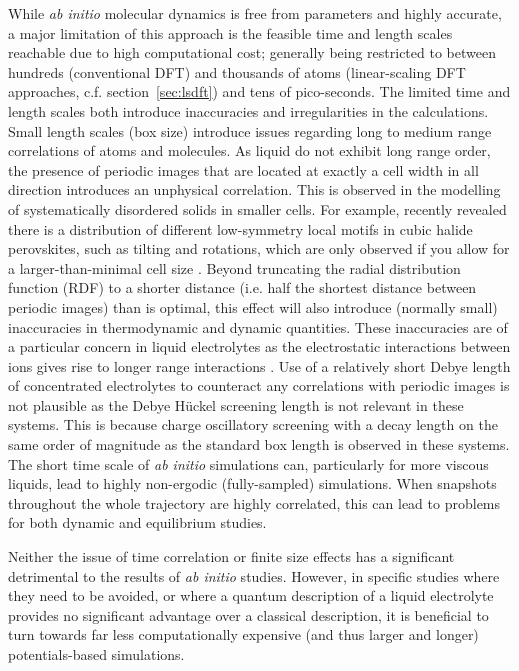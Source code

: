 \documentclass[../main.tex]{subfiles}
\begin{document}
While \textit{ab initio} molecular dynamics is free from parameters and highly accurate, a major limitation of this approach is the feasible time and length scales reachable due to high computational cost; generally being restricted to between hundreds (conventional DFT) and thousands of atoms (linear-scaling DFT approaches, c.f. section~\ref{sec:lsdft}) and tens of pico-seconds. The limited time and length scales both introduce inaccuracies and irregularities in the calculations. Small length scales (box size) introduce issues regarding long to medium range correlations of atoms and molecules. As liquid do not exhibit long range order, the presence of periodic images that are located at exactly a cell width in all direction introduces an unphysical correlation. This is observed in the modelling of systematically disordered solids in smaller cells\cite{Morgan_2011}. For example, \citeauthor{Zhao_2020} recently revealed there is a distribution of different low-symmetry local motifs in cubic halide perovskites, such as tilting and rotations, which are only observed if you allow for a larger-than-minimal cell size \cite{Zhao_2020}. Beyond truncating the radial distribution function (RDF) to a shorter distance (i.e. half the shortest distance between periodic images) than is optimal, this effect will also introduce (normally small) inaccuracies in thermodynamic and dynamic quantities\cite{Binder2009book, yeh_system-size_2004, botan_diffusion_2015, horbach_finite_1996}. These inaccuracies are of a particular concern in liquid electrolytes as the electrostatic interactions between ions gives rise to longer range interactions \cite{coles_correlation_2020}. Use of a relatively short Debye length of concentrated electrolytes to counteract any correlations with periodic images is not plausible as the Debye H\"{u}ckel screening length is not relevant in these systems. This is because charge oscillatory screening with a decay length on the same order of magnitude as the standard box length is observed in these systems\cite{coles_correlation_2020}. The short time scale of \textit{ab initio} simulations can, particularly for more viscous liquids, lead to highly non-ergodic (fully-sampled) simulations. When snapshots throughout the whole trajectory are highly correlated\cite{frenkel_understanding_2002}, this can lead to problems for both dynamic and equilibrium studies. 

Neither the issue of time correlation or finite size effects has a significant detrimental to the results of \textit{ab initio} studies. However, in specific studies where they need to be avoided, or where a quantum description of a liquid electrolyte provides no significant advantage over a classical description, it is beneficial to turn towards far less computationally expensive (and thus larger and longer) potentials-based simulations.
\end{document}
